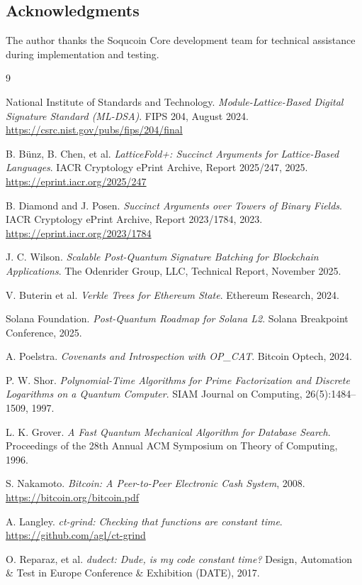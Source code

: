 \documentclass[10pt]{article}
\begin{document}
\subsection*{Acknowledgments}
The author thanks the Soqucoin Core development team for technical assistance during implementation and testing.

\begin{thebibliography}{9}

National Institute of Standards and Technology.
\textit{Module-Lattice-Based Digital Signature Standard (ML-DSA)}.
FIPS 204, August 2024.
\url{https://csrc.nist.gov/pubs/fips/204/final}

B. Bünz, B. Chen, et al.
\textit{LatticeFold+: Succinct Arguments for Lattice-Based Languages}.
IACR Cryptology ePrint Archive, Report 2025/247, 2025.
\url{https://eprint.iacr.org/2025/247}

B. Diamond and J. Posen.
\textit{Succinct Arguments over Towers of Binary Fields}.
IACR Cryptology ePrint Archive, Report 2023/1784, 2023.
\url{https://eprint.iacr.org/2023/1784}

J. C. Wilson.
\textit{Scalable Post-Quantum Signature Batching for Blockchain Applications}.
The Odenrider Group, LLC, Technical Report, November 2025.

V. Buterin et al.
\textit{Verkle Trees for Ethereum State}.
Ethereum Research, 2024.

Solana Foundation.
\textit{Post-Quantum Roadmap for Solana L2}.
Solana Breakpoint Conference, 2025.

A. Poelstra.
\textit{Covenants and Introspection with OP\_CAT}.
Bitcoin Optech, 2024.

P. W. Shor.
\textit{Polynomial-Time Algorithms for Prime Factorization and Discrete Logarithms on a Quantum Computer}.
SIAM Journal on Computing, 26(5):1484--1509, 1997.

L. K. Grover.
\textit{A Fast Quantum Mechanical Algorithm for Database Search}.
Proceedings of the 28th Annual ACM Symposium on Theory of Computing, 1996.

S. Nakamoto.
\textit{Bitcoin: A Peer-to-Peer Electronic Cash System}, 2008.
\url{https://bitcoin.org/bitcoin.pdf}

A. Langley.
\textit{ct-grind: Checking that functions are constant time}.
\url{https://github.com/agl/ct-grind}

O. Reparaz, et al.
\textit{dudect: Dude, is my code constant time?}
Design, Automation \& Test in Europe Conference \& Exhibition (DATE), 2017.

\end{thebibliography}
\end{document}
